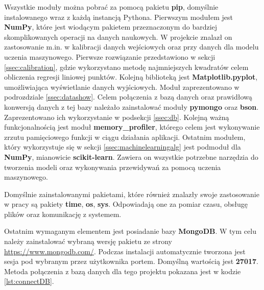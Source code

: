 Wszystkie moduły można pobrać za pomocą pakietu \textbf{pip}, domyślnie instalowanego wraz z każdą instancją Pythona. Pierwszym modułem jest \textbf{NumPy}, które jest wiodącym pakietem przeznaczonym do bardziej skomplikowanych operacji na danych naukowych. W projekcie znalazł on zastosowanie m.in. w kalibracji danych wejściowych oraz przy danych dla modelu uczenia maszynowego. Pierwsze rozwiązanie przedstawiono w sekcji \ref{ssec:calibration}, gdzie wykorzystano metodę najmniejszych kwadratów celem obliczenia regresji liniowej punktów. Kolejną biblioteką jest \textbf{Matplotlib.pyplot}, umożliwiająca wyświetlanie danych wyjściowych. Moduł zaprezentowano w podrozdziale \ref{ssec:datashow}. Celem połączenia z bazą danych oraz prawidłową konwersją danych z tej bazy należało zainstalować moduły \textbf{pymongo} oraz \textbf{bson}. Zaprezentowano ich wykorzystanie w podsekcji \ref{ssec:db}. Kolejną ważną funkcjonalnością jest moduł \textbf{memory\_profiler}, którego celem jest wykonywanie zrzutu pamięciowego funkcji w ciągu działania aplikacji. Ostatnim modułem, który wykorzystuje się w sekcji \ref{ssec:machinelearningalg} jest podmoduł dla \textbf{NumPy}, mianowicie \textbf{scikit-learn}. Zawiera on wszystkie potrzebne narzędzia do tworzenia modeli oraz wykonywania przewidywań za pomocą uczenia maszynowego.\par
Domyślnie zainstalowanymi pakietami, które również znalazły swoje zastosowanie w pracy są pakiety \textbf{time}, \textbf{os}, \textbf{sys}. Odpowiadają one za pomiar czasu, obsługę plików oraz komunikację z systemem.\par
Ostatnim wymaganym elementem jest posiadanie bazy \textbf{MongoDB}. W tym celu należy zainstalować wybraną wersję pakietu ze strony \url{https://www.mongodb.com/}. Podczas instalacji automatycznie tworzona jest sesja pod wybranym przez użytkownika portem. Domyślną wartością jest \textbf{27017}. Metoda połączenia z bazą danych dla tego projektu pokazana jest w kodzie \ref{lst:connectDB}.
